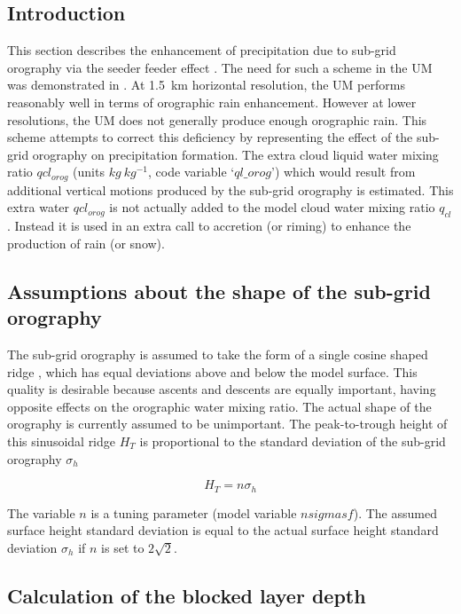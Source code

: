 \documentclass{UMDP_article}
\begin{document}
\subsection{Introduction}

This section describes the enhancement of precipitation due to sub-grid orography via the 
seeder feeder effect \citep{Bergeron:1965}.  The need for such a scheme in the UM was demonstrated in \cite{Smith:etal:2015}.  At 1.5~km horizontal resolution, the UM performs reasonably well in terms of orographic rain enhancement.  However at lower resolutions, the 
UM does not generally produce enough orographic rain.  This scheme attempts to correct this deficiency by representing the effect of the sub-grid orography on precipitation formation.   The extra cloud liquid water mixing ratio $qcl_{orog}$ (units  $kg~kg^{-1}$, code variable `$ql\_orog$') which would result from additional vertical motions produced by the sub-grid orography is estimated.  This extra water $qcl_{orog}$ is not actually added to the model cloud water mixing ratio $q_{cl}$.  Instead it is used in an extra call to accretion (or riming) to enhance the production of rain (or snow).  

\subsection{Assumptions about the shape of the sub-grid orography}

The sub-grid orography is assumed to take the form of a single cosine shaped ridge \citep{Smith:etal:2016}, which has equal deviations above and below the model surface.  
This quality is desirable because ascents and descents are equally important, having opposite effects on the orographic water mixing ratio.  
The actual shape of the orography is currently assumed to be unimportant.  
The peak-to-trough height of this sinusoidal ridge $H_T$ is proportional to the standard deviation of the sub-grid orography $\sigma_h$

\begin{equation} 
H_T = n \sigma_h
\end{equation}

The variable $n$ is a tuning parameter (model variable $nsigmasf$).  The assumed surface height standard deviation is equal to the actual surface height standard deviation $\sigma_h$ if $n$ is set to $2 \sqrt 2$.

\subsection{Calculation of the blocked layer depth}
\end{document}
